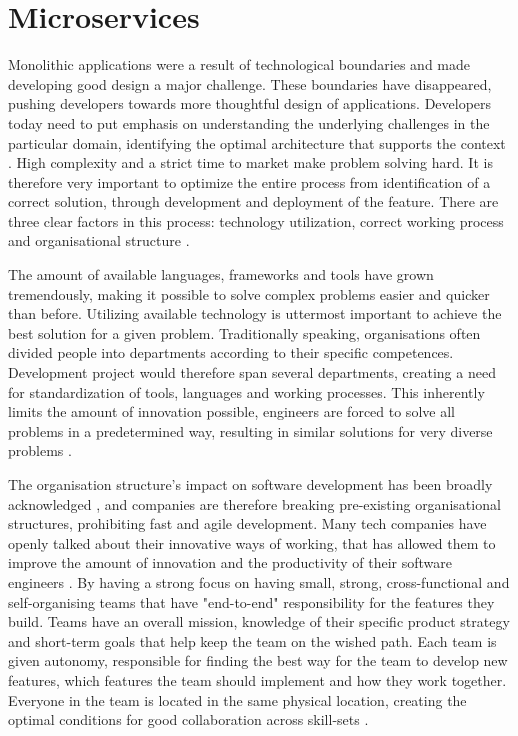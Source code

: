 \section{Microservices}
Monolithic applications were a result of technological boundaries and made developing good design a major challenge. These boundaries have disappeared, pushing developers towards more thoughtful design of applications. Developers today need to put emphasis on understanding the underlying challenges in the particular domain, identifying the optimal architecture that supports the context \cite[t.~17:00]{evans2016tackling}. High complexity and a strict time to market make problem solving hard. It is therefore very important to optimize the entire process from identification of a correct solution, through development and deployment of the feature. There are three clear factors in this process: technology utilization, correct working process and organisational structure \cite[t.~12:16]{george2016it} \cite[preface]{newman2015microservices}. 

The amount of available languages, frameworks and tools have grown tremendously, making it possible to solve complex problems easier and quicker than before. Utilizing available technology is uttermost important to achieve the best solution for a given problem. Traditionally speaking, organisations often divided people into departments according to their specific competences. Development project would therefore span several departments, creating a need for standardization of tools, languages and working processes. This inherently limits the amount of innovation possible, engineers are forced to solve all problems in a predetermined way, resulting in similar solutions for very diverse problems \cite[t.~14:20]{fowler2014microservicesoamonolith} \cite[00:30]{kniberg2014spotify} \cite{murer2015fifteen} \cite[17:00]{meshenberg2016microservices}. 

The organisation structure's impact on software development has been broadly acknowledged \cite{fowler2014microservices, newman2014demystifying}, and companies are therefore breaking pre-existing organisational structures, prohibiting fast and agile development. Many tech companies have openly talked about their innovative ways of working, that has allowed them to improve the amount of innovation and the productivity of their software engineers \cite[00:30]{kniberg2014spotify} \cite[16:00]{meshenberg2016microservices}. By having a strong focus on having small, strong, cross-functional and self-organising teams that have "end-to-end" responsibility for the features they build. Teams have an overall mission, knowledge of their specific product strategy and short-term goals that help keep the team on the wished path. Each team is given autonomy, responsible for finding the best way for the team to develop new features, which features the team should implement and how they work together. Everyone in the team is located in the same physical location, creating the optimal conditions for good collaboration across skill-sets \cite[01:00]{kniberg2014spotify} \cite{gray2006conversation}.

